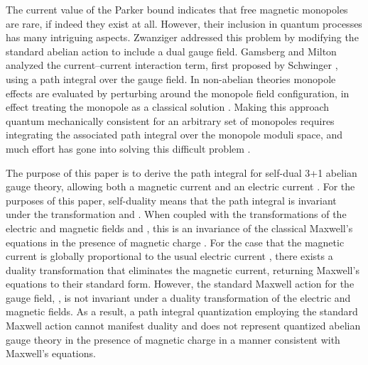 \documentclass[a4paper,a4paper]{article}
\begin{document}
The current value of the Parker bound \cite{Freese} indicates that free magnetic monopoles are rare, if indeed they exist at all. However, their inclusion in quantum processes has many intriguing aspects.  Zwanziger \cite{Zwanziger} addressed this problem by modifying the standard abelian action to include a dual gauge field. Gamsberg and Milton \cite{GamsbergMilton} analyzed the current--current interaction term, first proposed by Schwinger \cite{Schwinger}, using a path integral over the gauge field. In non-abelian theories monopole effects are evaluated by perturbing around the monopole field configuration, in effect treating the monopole as a classical solution \cite{Coleman}.  Making this approach quantum mechanically consistent for an arbitrary set of monopoles requires integrating the associated path integral over the monopole moduli space, and much effort has gone into solving this difficult problem \cite{PaisSchroers}.  

The purpose of this paper is to derive the path integral for self-dual 3+1 abelian gauge theory,  allowing both a magnetic current \coordHE{} and an electric current \myHighlight{$\jmath$}\coordHE{}.  For the purposes of this paper, self-duality means that the path integral is invariant under the transformation \coordHE{} and \coordHE{}.  When coupled with the transformations of the electric and magnetic fields \coordHE{} and \coordHE{}, this is an invariance of the classical Maxwell's equations in the presence of magnetic charge \cite{Jackson}. For the case that the magnetic current \coordHE{} is globally proportional to the usual electric current \myHighlight{$\jmath$}\coordHE{}, there exists a duality transformation that eliminates the magnetic current, returning Maxwell's equations to their standard form.  However, the standard Maxwell action for the gauge field, \coordHE{}, is not invariant under a duality transformation of the electric and magnetic fields. As a result, a path integral quantization employing the standard Maxwell action cannot manifest duality and does not represent quantized abelian gauge theory in the presence of magnetic charge in a manner consistent with Maxwell's equations.
\end{document}
